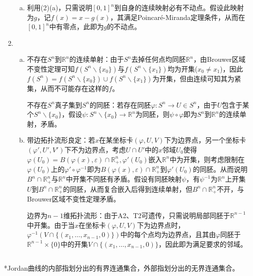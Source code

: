 \documentclass[a4paper,UTF8,fontset=windows]{ctexart}
\begin{document}
\begin{enumerate}[(1)]
\begin{enumerate}[(a)]
    \item
    利用(2)(a)，只需说明$[0,1]^n$到自身的连续映射必有不动点。假设此映射为$g$，记$f(x)=x-g(x)$，其满足Poincar\'e-Miranda定理条件，从而在$[0,1]^n$中有零点，此即为$g$的不动点。
    \end{enumerate}
    
    \item
    \begin{enumerate}[(a)]
    \item
    不存在$S^n$到$\mathbb{R}^n$的连续单射：由于$S^n$去掉任何点均同胚$\mathbb{R}^n$，由Brouwer区域不变性定理可知$f(S^n\backslash\{x_0\})$与$f(S^n\backslash\{x_1\})$均为开集($x_0\ne x_1$)，因此$f(S^n)=f(S^n\backslash\{x_0\})\cup f(S^n\backslash\{x_1\})$为开集，但由连续可知其为紧集，从而不可能存在这样的$f$。
    
    不存在$S^n$真子集到$S^n$的同胚：若存在同胚$\varphi:S^n\to U\in S^n$，由于$U$包含于某个$S^n\backslash\{x_0\}$，假设$\psi:S^n\backslash\{x_0\}\to\mathbb{R}^n$为同胚，则$\psi\circ\varphi$即为$S^n$到$\mathbb{R}^n$的连续单射，矛盾。
    
    \item
    带边拓扑流形良定：若$x$在某坐标卡$(\varphi,U,V)$下为边界点，另一个坐标卡$(\varphi',U',V')$下不为边界点，考虑$U\cap U'$中的$x$邻域$U_0$使得$\varphi(U_0)=B(\varphi(x),\varepsilon)\cap\mathbb{R}_+^n,\varphi'(U_0)$嵌入$\mathbb{R}^n$中为开集，则考虑限制在$\varphi(U_0)$上的$\varphi'\circ\varphi^{-1}$即为$B(\varphi(x),\varepsilon)\cap\mathbb{R}_+^n$到$\varphi'(U_0)$的同胚。从而说明$B^n\cap\mathbb{R}_+^n$与$\mathbb{R}^n$中开集不同胚有矛盾。假设有同胚映射$\psi$，有$\psi^{-1}$为$\mathbb{R}^n$上开集$U$到$B^n\cap\mathbb{R}_+^n$的同胚，从而复合嵌入后得到连续单射，但$B^n\cap\mathbb{R}_+^n$不开，与Brouwer区域不变性定理矛盾。
    
    边界为$n-1$维拓扑流形：由于A2、T2可遗传，只需说明局部同胚于$\mathbb{R}^{n-1}$中开集。由于当$x$在坐标卡$(\varphi,U,V)$下为边界点时，$\varphi^{-1}(V\cap\{(x_1,\dots,x_{n-1},0)\})$中的每个点均为边界点，且其由$\varphi$同胚于$\mathbb{R}^{n-1}\times\{0\}$中的开集$V\cap\{(x_1,\dots,x_{n-1},0)\}$，因此即为满足要求的邻域。
    \end{enumerate}
\end{enumerate}

\subsection{}
*Jordan曲线的内部指划分出的有界连通集合，外部指划分出的无界连通集合。
\end{document}
